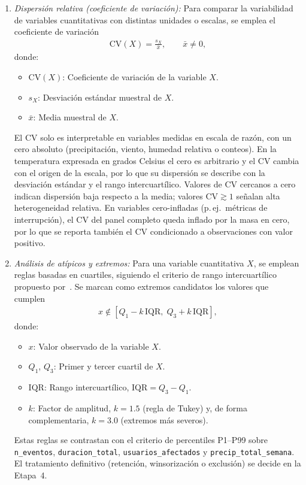 \begin{enumerate}
    \item \textit{Dispersión relativa (coeficiente de variación):}
    Para comparar la variabilidad de variables cuantitativas con distintas unidades o escalas, se emplea el coeficiente de variación
    \begin{equation}
        \begin{aligned}
        \mathrm{CV}(X) = \frac{s_X}{\bar{x}}, \qquad \bar{x} \neq 0,
        \end{aligned}
        \label{eq:cv}
    \end{equation}
    donde:
    \begin{itemize}
        \item $\mathrm{CV}(X)$: Coeficiente de variación de la variable $X$.
        \item $s_X$: Desviación estándar muestral de $X$.
        \item $\bar{x}$: Media muestral de $X$.
    \end{itemize}
    El CV solo es interpretable en variables medidas en escala de razón, con un cero absoluto (precipitación, viento, humedad relativa o conteos). En la temperatura expresada en grados Celsius el cero es arbitrario y el CV cambia con el origen de la escala, por lo que su dispersión se describe con la desviación estándar y el rango intercuartílico. Valores de $\mathrm{CV}$ cercanos a cero indican dispersión baja respecto a la media; valores $\mathrm{CV}\gtrsim 1$ señalan alta heterogeneidad relativa. En variables cero-infladas (p.\,ej.\ métricas de interrupción), el CV del panel completo queda inflado por la masa en cero, por lo que se reporta también el CV condicionado a observaciones con valor positivo.

    \item \textit{Análisis de atípicos y extremos:}
    Para una variable cuantitativa $X$, se emplean reglas basadas en cuartiles, siguiendo el criterio de rango intercuartílico propuesto por~\cite{ref50}. Se marcan como extremos candidatos los valores que cumplen
    \begin{equation}
        \begin{aligned}
        x \notin \left[ Q_1 - k\,\mathrm{IQR},\; Q_3 + k\,\mathrm{IQR} \right],
        \end{aligned}
        \label{eq:atipicos_iqr}
    \end{equation}
    donde:
    \begin{itemize}
        \item $x$: Valor observado de la variable $X$.
        \item $Q_1$, $Q_3$: Primer y tercer cuartil de $X$.
        \item $\mathrm{IQR}$: Rango intercuartílico, $\mathrm{IQR} = Q_3 - Q_1$.
        \item $k$: Factor de amplitud, $k = 1{.}5$ (regla de Tukey) y, de forma complementaria, $k = 3{.}0$ (extremos más severos).
    \end{itemize}
    Estas reglas se contrastan con el criterio de percentiles P1--P99 sobre \texttt{n\_eventos}, \texttt{duracion\_total}, \texttt{usuarios\_afectados} y \texttt{precip\_total\_semana}. El tratamiento definitivo (retención, winsorización o exclusión) se decide en la Etapa~4.


\end{enumerate}

